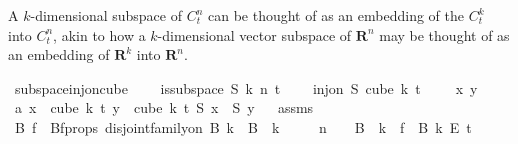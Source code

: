 \begin{isabellebody}
\begin{isamarkuptext}%
A $k$-dimensional subspace of $C^n_t$ can be thought of as an embedding of the $C^k_t$
into $C^n_t$, akin to how a $k$-dimensional vector subspace of $\mathbf{R}^n$ may be thought of as
an embedding of $\mathbf{R}^k$ into $\mathbf{R}^n$.%
\end{isamarkuptext}\isamarkuptrue%
\isamarkupfalse%
\ subspace{\isacharunderscore}{\kern0pt}inj{\isacharunderscore}{\kern0pt}on{\isacharunderscore}{\kern0pt}cube{\isacharcolon}{\kern0pt}\ \isanewline
\ \ \ {\isachardoublequoteopen}is{\isacharunderscore}{\kern0pt}subspace\ S\ k\ n\ t{\isachardoublequoteclose}\ \isanewline
\ \ \ {\isachardoublequoteopen}inj{\isacharunderscore}{\kern0pt}on\ S\ {\isacharparenleft}{\kern0pt}cube\ k\ t{\isacharparenright}{\kern0pt}{\isachardoublequoteclose}\isanewline
%
\isadelimproof
%
\endisadelimproof
%
\isatagproof
{}\isamarkupfalse%
\ \isanewline
\ \isamarkupfalse%
\ x\ y\isanewline
\ \isamarkupfalse%
\ a{\isacharcolon}{\kern0pt}\ {\isachardoublequoteopen}x\ {\isasymin}\ cube\ k\ t{\isachardoublequoteclose}\ {\isachardoublequoteopen}y\ {\isasymin}\ cube\ k\ t{\isachardoublequoteclose}\ {\isachardoublequoteopen}S\ x\ {\isacharequal}{\kern0pt}\ S\ y{\isachardoublequoteclose}\isanewline
\ \isamarkupfalse%
\ assms\ \isamarkupfalse%
\ B\ f\ \ Bf{\isacharunderscore}{\kern0pt}props{\isacharcolon}{\kern0pt}\ {\isachardoublequoteopen}disjoint{\isacharunderscore}{\kern0pt}family{\isacharunderscore}{\kern0pt}on\ B\ {\isacharbraceleft}{\kern0pt}{\isachardot}{\kern0pt}{\isachardot}{\kern0pt}k{\isacharbraceright}{\kern0pt}\ {\isasymand}\ {\isasymUnion}{\isacharparenleft}{\kern0pt}B\ {\isacharbackquote}{\kern0pt}\ {\isacharbraceleft}{\kern0pt}{\isachardot}{\kern0pt}{\isachardot}{\kern0pt}k{\isacharbraceright}{\kern0pt}{\isacharparenright}{\kern0pt}\ {\isacharequal}{\kern0pt}\isanewline
\ \ \ \ {\isacharbraceleft}{\kern0pt}{\isachardot}{\kern0pt}{\isachardot}{\kern0pt}{\isacharless}{\kern0pt}n{\isacharbraceright}{\kern0pt}\ {\isasymand}\ {\isacharparenleft}{\kern0pt}{\isacharbraceleft}{\kern0pt}{\isacharbraceright}{\kern0pt}\ {\isasymnotin}\ B\ {\isacharbackquote}{\kern0pt}\ {\isacharbraceleft}{\kern0pt}{\isachardot}{\kern0pt}{\isachardot}{\kern0pt}{\isacharless}{\kern0pt}k{\isacharbraceright}{\kern0pt}{\isacharparenright}{\kern0pt}\ {\isasymand}\ f\ {\isasymin}\ {\isacharparenleft}{\kern0pt}B\ k{\isacharparenright}{\kern0pt}\ {\isasymrightarrow}\isactrlsub E\ {\isacharbraceleft}{\kern0pt}{\isachardot}{\kern0pt}{\isachardot}{\kern0pt}{\isacharless}{\kern0pt}t{\isacharbraceright}{\kern0pt}\ {\isasymand}\isanewline

\end{isabellebody}
